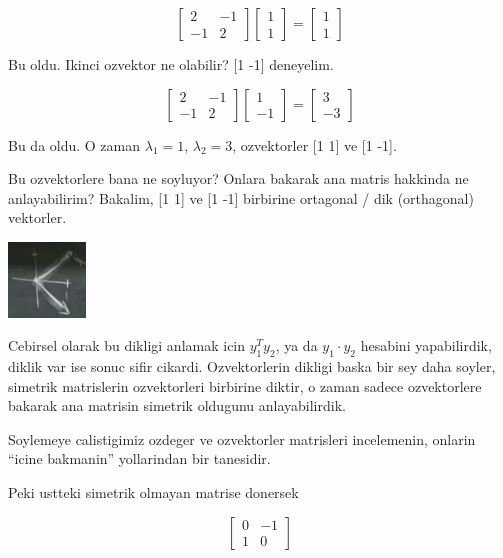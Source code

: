 \documentclass[12pt,fleqn]{article}
\begin{document}
\[ 
\left[\begin{array}{rr}
2 & -1 \\
-1 & 2
\end{array}\right]
\left[\begin{array}{c}
1 \\
1
\end{array}\right]
=
\left[\begin{array}{c}
1 \\
1
\end{array}\right]
 \]

Bu oldu. Ikinci ozvektor ne olabilir? [1 -1] deneyelim. 

\[ 
\left[\begin{array}{rr}
2 & -1 \\
-1 & 2
\end{array}\right]
\left[\begin{array}{r}
1 \\
-1
\end{array}\right]
=
\left[\begin{array}{r}
3 \\
-3
\end{array}\right]
 \]

Bu da oldu. O zaman $\lambda_1 = 1$, $\lambda_2 = 3$, ozvektorler [1 1] ve
[1 -1]. 

Bu ozvektorlere bana ne soyluyor? Onlara bakarak ana matris hakkinda ne
anlayabilirim? Bakalim, [1 1] ve [1 -1] birbirine ortagonal / dik
(orthagonal) vektorler. 

\includegraphics[height=2cm]{5_5.png}

Cebirsel olarak bu dikligi anlamak icin $y_1^Ty_2$, ya da $y_1 \cdot y_2$
hesabini yapabilirdik, diklik var ise sonuc sifir cikardi. Ozvektorlerin
dikligi baska bir sey daha soyler, simetrik matrislerin ozvektorleri
birbirine diktir, o zaman sadece ozvektorlere bakarak ana matrisin simetrik
oldugunu anlayabilirdik.

Soylemeye calistigimiz ozdeger ve ozvektorler matrisleri incelemenin,
onlarin ``icine bakmanin'' yollarindan bir tanesidir. 

Peki ustteki simetrik olmayan matrise donersek

\[ 
\left[
\begin{array}{rr}
0 & -1 \\
1 & 0
\end{array}
\right]
 \]
\end{document}

